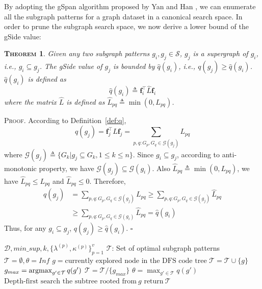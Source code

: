 \documentclass[conference]{IEEEtran}
\newcommand{\gscore}[0]{gSide}
\newcommand{\galgo}[0]{gMSV}
\newtheorem{Theorem}{\textsc{Theorem}}
\begin{document}
By adopting the gSpan algorithm proposed by Yan and Han \cite{yan2002gspan}, we can enumerate all the subgraph patterns for a graph dataset in a canonical search space. In order to prune the subgraph search space, we now derive a lower bound of the {\gscore} value:
\begin{Theorem}\label{theorem:bound}
Given any two subgraph patterns $g_i,g_j\in\mathcal{S}$, $g_j$ is a supergraph of $g_i$, \emph{i.e.}, $g_i\subseteq g_j$. The {\gscore} value of $g_j$ is bounded by $\hat{q}(g_i)$, \emph{i.e.}, $q(g_j)\ge\hat{q}(g_i)$. $\hat{q}(g_i)$ is defined as
\begin{equation}
\hat{q}(g_i)\triangleq\mathbf{f}_i^\top\hat{L}\mathbf{f}_i
\label{eq:bound}
\end{equation}
where the matrix $\hat{L}$ is defined as $\hat{L}_{pq}\triangleq\min(0,L_{pq})$.
\end{Theorem}\textsc{Proof}.
According to Definition~\ref{def:q},
\begin{equation}
q(g_j)=\mathbf{f}_j^\top L\mathbf{f}_j=\sum_{p,q:G_p,G_q\in\mathcal{G}(g_j)}L_{pq}
\label{eq:proof1}
\end{equation}
where $\mathcal{G}(g_j)\triangleq\{G_k|g_j\subseteq G_k,1\le k\le n\}$. Since $g_i\subseteq g_j$, according to anti-monotonic property, we have $\mathcal{G}(g_j)\subseteq\mathcal{G}(g_i)$. Also $\hat{L}_{pq}\triangleq\min(0,L_{pq})$, we have $\hat{L}_{pq}\le L_{pq}$ and $\hat{L}_{pq}\le0$. Therefore,
\begin{equation}
\begin{split}
q(g_j)&=\sum_{p,q:G_p,G_q\in\mathcal{G}(g_j)}L_{pq}\ge\sum_{p,q:G_p,G_q\in\mathcal{G}(g_j)}\hat{L}_{pq}\\
&\ge\sum_{p,q:G_p,G_q\in\mathcal{G}(g_i)}\hat{L}_{pq}=\hat{q}(g_i)
\label{eq:proof2}
\end{split}
\end{equation}
Thus, for any $g_i\subseteq g_j$, $q(g_j)\ge\hat{q}(g_i)$. $\square$\begin{algorithm}
\caption{The Proposed Method: \galgo}
\label{alg1}
\begin{algorithmic}[1]
\REQUIRE $\mathcal{D}, min\_sup, k, \{\lambda^{(p)},\kappa^{(p)}\}_{p=1}^{v}$
\ENSURE $\mathcal{T}$: Set of optimal subgraph patterns
\STATE $\mathcal{T}=\emptyset, \theta=Inf$
\STATE $g=\text{currently explored node in the DFS code tree}$
\STATE $\mathcal{T}=\mathcal{T}\cup\{g\}$
\STATE $g_{max}=\operatornamewithlimits{argmax}_{g'\in\mathcal{T}}q(g')$
\STATE $\mathcal{T}=\mathcal{T}/\{g_{max}\}$
\ENDIF
\STATE $\theta=\max_{g'\in\mathcal{T}}q(g')$
\ENDIF
{}
\STATE $\text{Depth-first search the subtree rooted from}~g$
\ENDIF
\ENDIF
\ENDWHILE
\STATE $\text{return}~\mathcal{T}$
\end{algorithmic}
\end{algorithm}%
\end{document}
